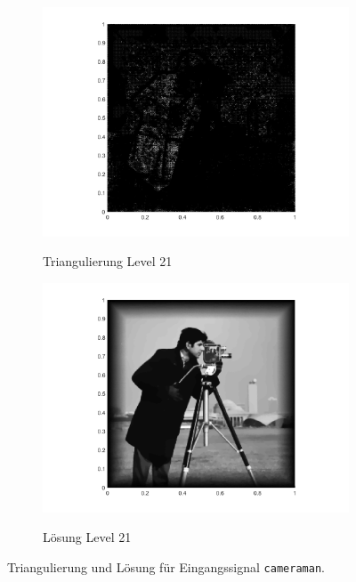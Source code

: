 \begin{figure}[p]
  \begin{subfigure}[b]{.48\linewidth}
    \centering
    \caption{Triangulierung Level 21}
    \includegraphics[trim = 100 30 80 20, clip, width=\linewidth]
      {pictures/chapExperiments/secGrayscale/cam/adaptive/lvl21/triangulation.png}
    \label{fig:camLvl21Triang}
  \end{subfigure}
  \quad
  \begin{subfigure}[b]{.48\linewidth}
    \centering
    \caption{Lösung Level 21}
    \includegraphics[trim = 100 30 80 20, clip, width=\linewidth]
      {pictures/chapExperiments/secGrayscale/cam/adaptive/lvl21/solutionGrayscale.png}
    \label{fig:camLvl21Sol}
  \end{subfigure}
  \caption{Triangulierung und Lösung für Eingangssignal \texttt{cameraman}.}
  \label{fig:camTriang}
\end{figure}


